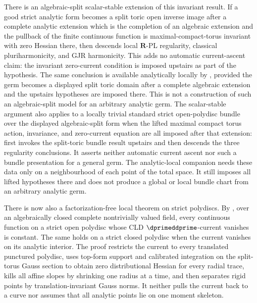 There is an algebraic-split scalar-stable extension of this invariant result.
If a good strict analytic form becomes a split toric open inverse image after
a complete analytic extension which is the completion of an algebraic
extension and the pullback of the finite continuous function is
maximal-compact-torus invariant with zero Hessian there, then
 descends
local \(\mathbf R\)-PL regularity, classical pluriharmonicity, and GJR
harmonicity.  This adds no automatic current-ascent claim: the invariant
zero-current condition is imposed upstairs as part of the hypothesis.
The same conclusion is available analytically locally by
,
provided the germ becomes a displayed split toric domain after a complete
algebraic extension and the upstairs hypotheses are imposed there.  This is
not a construction of such an algebraic-split model for an arbitrary analytic
germ.
The scalar-stable argument also applies to a locally trivial standard strict
open-polydisc bundle over the displayed algebraic-split form when the lifted
maximal compact torus action, invariance, and zero-current equation are all
imposed after that extension:
first invokes the split-toric bundle result upstairs and then descends the
three regularity conclusions.  It asserts neither automatic current ascent
nor such a bundle presentation for a general germ.
The analytic-local companion
needs these data only on a neighbourhood of each point of the total space.
It still imposes all lifted hypotheses there and does not produce a global or
local bundle chart from an arbitrary analytic germ.

There is now also a factorization-free local theorem on strict polydiscs.
By , over an algebraically
closed complete nontrivially valued field, every continuous function on a
strict open polydisc whose CLD \(\dprimeddprime\)-current vanishes is
constant.  The same holds on a strict closed polydisc when the current
vanishes on its analytic interior.  The proof restricts the current to every
translated punctured polydisc, uses top-form support and calibrated
integration on the split-torus Gauss section to obtain zero distributional
Hessian for every radial trace, kills all affine slopes by shrinking one
radius at a time, and then separates rigid points by translation-invariant
Gauss norms.  It neither pulls the current back to a curve nor assumes that
all analytic points lie on one moment skeleton.

